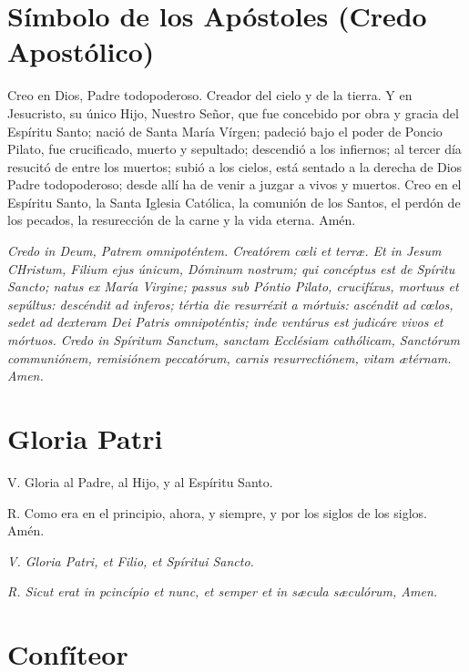 \documentclass[a4paper,11pt, oneside]{report}
\begin{document}
  \section*{Símbolo de los Apóstoles (Credo Apostólico)}

    Creo en Dios, Padre todopoderoso. Creador del cielo y de la tierra. Y en Jesucristo, su único Hijo, Nuestro Señor, que fue concebido por
    obra y gracia del Espíritu Santo; nació de Santa María Vírgen; padeció bajo el poder de Poncio Pilato, fue crucificado, muerto y sepultado;
    descendió a los infiernos; al tercer día resucitó de entre los muertos; subió a los cielos, está sentado a la derecha de Dios Padre todopoderoso;
    desde allí ha de venir a juzgar a vivos y muertos. Creo en el Espíritu Santo, la Santa Iglesia Católica, la comunión de los Santos, el perdón
    de los pecados, la resurección de la carne y la vida eterna. Amén.

    \medskip

    \textit{Credo in Deum, Patrem omnipoténtem. Creatórem c{\oe}li et terr{\ae}. Et in Jesum CHristum, Filium ejus únicum, Dóminum nostrum; qui concéptus
    est de Spíritu Sancto; natus ex María Virgine; passus sub Póntio Pilato, crucifíxus, mortuus et sepúltus: descéndit ad inferos; tértia die resurréxit
    a mórtuis: ascéndit ad c{\oe}los, sedet ad dexteram Dei Patris omnipoténtis; inde ventúrus est judicáre vivos et mórtuos. Credo in Spíritum Sanctum,
    sanctam Ecclésiam cathólicam, Sanctórum communiónem, remisiónem peccatórum, carnis resurrectiónem, vitam {\ae}térnam. Amen.}

  \section*{Gloria Patri}

    V. Gloria al Padre, al Hijo, y al Espíritu Santo.\par
    \indent R. Como era en el principio, ahora, y siempre, y por los siglos de los siglos. Amén.

    \medskip

    \textit{V. Gloria Patri, et Filio, et Spíritui Sancto.}\par
    \indent \textit{R. Sicut erat in pcincípio et nunc, et semper et in s{\ae}cula s{\ae}culórum, Amen.}

  \section*{Confíteor}
\end{document}
